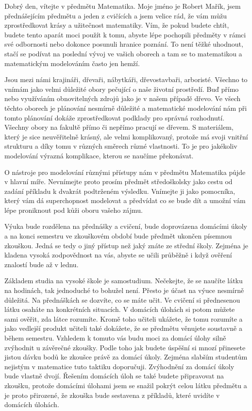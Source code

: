 \documentclass[12pt]{article}
\begin{document}
Dobrý den, vítejte v předmětu Matematika. Moje jméno je Robert Mařík, jsem přednášejícím předmětu a jeden z cvičících a jsem velice rád, že vám můžu zprostředkovat krásy a užitečnost matematiky. Vím, že pokud budete chtít, budete tento aparát moci použít k tomu, abyste lépe pochopili předměty v rámci své odbornosti nebo dokonce posunuli hranice poznání. To není těžké uhodnout, stačí se podívat na poslední vývoj ve vašich oborech a tam se to matematikou a matematickým modelováním často jen hemží.

Jsou mezi námi krajináři, dřevaři, nábytkáři, dřevostavbaři, arboristé. Všechno to vnímám jako velmi důležité obory pečující o naše životní prostředí. Buď přímo nebo využíváním obnovitelných zdrojů jako je v našem případě dřevo. Ve všech těchto oborech je plánování nesmírně důležité a matematické modelování nám při tomto plánování dokáže zprostředkovat podklady pro správná rozhodnutí. Všechny obory na fakultě přímo či nepřímo pracují se dřevem. S materiálem, který je sice neuvěřitelně krásný, ale velmi komplikovaný, protože má svoji vnitřní strukturu a díky tomu v různých směrech různé vlastnosti. To je pro jakékoliv modelování výrazná komplikace, kterou se naučíme překonávat.

O nástroje pro modelování různými přístupy nám v předmětu Matematika půjde v hlavní míře. Nevnímejte proto prosím předmět středoškolsky jako cestu od zadání příkladu k dvakrát podtrženém výsledku. Vnímejte ji jako pomocníka, který vám dá superchopnost modelovat a předvídat co se bude dít a umožní vám lépe proniknout pod kůži oboru vašeho zájmu.

Výuka bude rozdělena na přednášky a cvičení, bude doprovázena domácími úkoly a na konci semestru ve zkouškovém období bude předmět ukončen písemnou zkouškou. Jedná se tedy o jiný přístup než jaký znáte ze střední školy. Zejména je kladena vysoká zodpovědnost na vás, abyste se učili průběžně i když ověření znalostí bude až v lednu.

Základem studia na vysoké škole je samostudium. Nečekejte, že se naučíte látku na hodinách, tak jednoduché to bohužel není. Přesto je účast na výuce nesmírně důležitá. Na přednáškách se dozvíte, co se máte učit. Ve cvičení si přednesenou látku osaháte na konkrétních situacích. V domácích úlohách si potom můžete sami ověřit, zda látce rozumíte. Kromě toho učiteli ukážete, že tomu rozumíte a jako vedlejší produkt učiteli také dokážete, že se předmětu věnujete soustavně a během semestru. Vzhledem k tomuto vás budu moci za domácí úlohy silně zvýhodnit u závěrečné zkoušky. Podle toho jak budete úspěšní si mnozí přinesete jistou dávku bodů ke zkoušce právě za domácí úkoly. Zejména slabším studentům nejistým v matematice tuto taktiku doporučuji. Zvýhodnění za domácí úkoly bude vlastně dvojí. Řešením domácích úloh se také budete připravovat na zkoušku, protože domácími úlohami jsem se snažil pokrýt celou látku předmětu a je proto přirozené, že zkouška bude sestavena z příkladů, které uvidíte v domácích úlohách.
\end{document}

